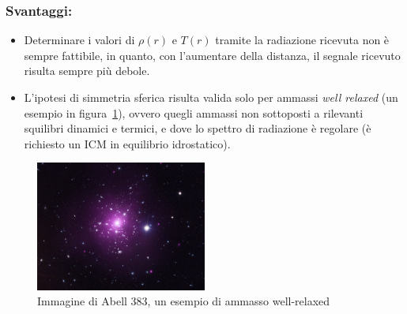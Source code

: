\subsubsection{\textbf{Svantaggi:}} 
\begin{itemize}
    \item Determinare i valori di $\rho(r)$ e $T(r)$ tramite la radiazione ricevuta non è sempre fattibile, in quanto, con l’aumentare della distanza, il segnale ricevuto risulta sempre più debole. 
    \item L’ipotesi di simmetria sferica risulta valida solo per ammassi \emph{well relaxed} (un esempio in figura~\ref{fig:well-relaxed-cluster}), ovvero quegli ammassi non sottoposti a rilevanti squilibri dinamici e termici, e dove lo spettro di radiazione è regolare (è richiesto un ICM in equilibrio idrostatico).
\end{itemize}
\begin{figure}
    \centering
    \includegraphics[width = 0.5\textwidth]{immagini/relaxed-cluster.png}
    \caption{Immagine di Abell 383, un esempio di ammasso well-relaxed}
    \label{fig:well-relaxed-cluster}
\end{figure}

